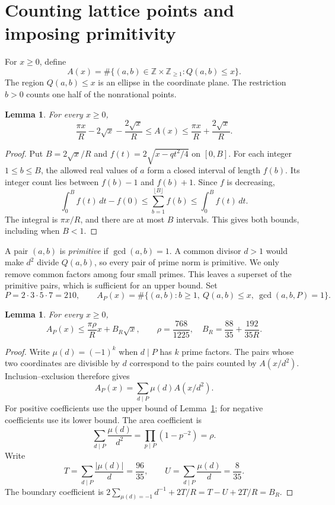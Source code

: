 \documentclass[11pt]{article}
\newtheorem{lemma}[theorem]{Lemma}
\newcommand{\Z}{\mathbb Z}
\begin{document}
\section{Counting lattice points and imposing primitivity}\label{counting}

For \(x\ge0\), define
\[
 A(x)=\#\{(a,b)\in\Z\times\Z_{\ge1}:Q(a,b)\le x\}.
\]
The region \(Q(a,b)\le x\) is an ellipse in the coordinate plane.
The restriction \(b>0\) counts one half of the nonrational points.

\begin{lemma}\label{lattice}
For every \(x\ge0\),
\[
 \frac{\pi x}{R}-2\sqrt x-\frac{2\sqrt x}{R}
 \le A(x)\le
 \frac{\pi x}{R}+\frac{2\sqrt x}{R}.
\]
\end{lemma}
\begin{proof}
Put \(B=2\sqrt x/R\) and
\(f(t)=2\sqrt{x-qt^2/4}\) on \([0,B]\).
For each integer \(1\le b\le B\), the allowed real values of \(a\)
form a closed interval of length \(f(b)\). Its integer count lies
between \(f(b)-1\) and \(f(b)+1\). Since \(f\) is decreasing,
\[
 \int_0^B f(t)\,dt-f(0)
 \le\sum_{b=1}^{\lfloor B\rfloor}f(b)
 \le\int_0^B f(t)\,dt.
\]
The integral is \(\pi x/R\), and there are at most \(B\) intervals.
This gives both bounds, including when \(B<1\).
\end{proof}

A pair \((a,b)\) is \emph{primitive} if \(\gcd(a,b)=1\). A common
divisor \(d>1\) would make \(d^2\) divide \(Q(a,b)\), so every pair of
prime norm is primitive. We only remove common factors among four
small primes. This leaves a superset of the primitive pairs, which
is sufficient for an upper bound. Set
\[
 P=2\cdot3\cdot5\cdot7=210,\qquad
 A_P(x)=\#\{(a,b):b\ge1,\ Q(a,b)\le x,\ \gcd(a,b,P)=1\}.
\]

\begin{lemma}\label{primitive}
For every \(x\ge0\),
\[
 A_P(x)\le\frac{\pi\rho}{R}x+B_R\sqrt x,
 \qquad
 \rho=\frac{768}{1225},\quad
 B_R=\frac{88}{35}+\frac{192}{35R}.
\]
\end{lemma}
\begin{proof}
Write \(\mu(d)=(-1)^k\) when \(d\mid P\) has \(k\) prime factors.
The pairs whose two coordinates are divisible by \(d\) correspond
to the pairs counted by \(A(x/d^2)\). Inclusion--exclusion therefore gives
\[
 A_P(x)=\sum_{d\mid P}\mu(d)A(x/d^2).
\]
For positive coefficients use the upper bound of Lemma~\ref{lattice};
for negative coefficients use its lower bound. The area coefficient is
\[
 \sum_{d\mid P}\frac{\mu(d)}{d^2}
   =\prod_{p\mid P}(1-p^{-2})=\rho.
\]
Write
\[
 T=\sum_{d\mid P}\frac{|\mu(d)|}{d}=\frac{96}{35},\qquad
 U=\sum_{d\mid P}\frac{\mu(d)}d=\frac8{35}.
\]
The boundary coefficient is
\(2\sum_{\mu(d)=-1}d^{-1}+2T/R=T-U+2T/R=B_R\).
\end{proof}
\end{document}
